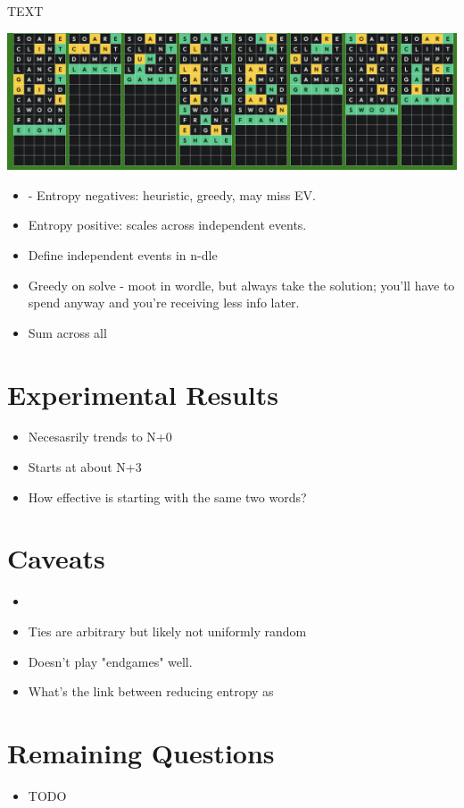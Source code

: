 \documentclass[11pt, oneside]{article}   	%
\begin{document}
TEXT

\includegraphics[width=\textwidth]{octordle}


\begin{itemize}
\item - Entropy negatives: heuristic, greedy, may miss EV.
\item Entropy positive: scales across independent events.
\item Define independent events in n-dle
\item Greedy on solve - moot in wordle, but always take the solution; you'll have to spend anyway and you're receiving less info later.
 \item Sum across all
\end{itemize}

\section{Experimental Results}
\begin{itemize}
 \item Necesasrily trends to N+0
\item Starts at about N+3
\item How effective is starting with the same two words?
\end{itemize}

\section{Caveats}
\begin{itemize}
\item 
\item Ties are arbitrary but likely not uniformly random
\item  Doesn't play "endgames" well.  
\item What's the link between reducing entropy as 
\end{itemize}

\section{Remaining Questions}
\begin{itemize}
\item TODO
\end{itemize}
\end{document}
